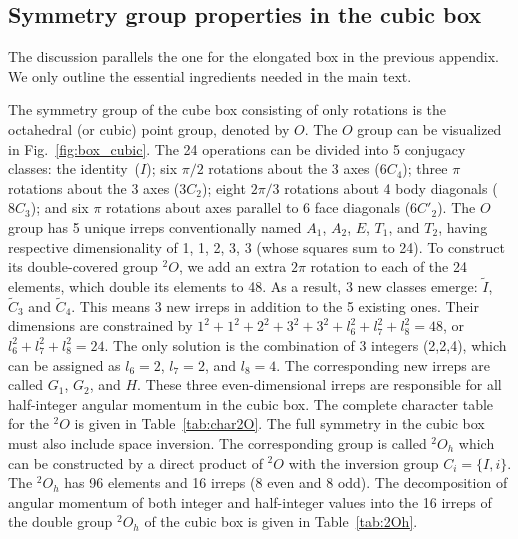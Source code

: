 \documentclass[aps,prd,reprint,showpacs,floatfix,longbibliography,,superscriptaddress]{revtex4-1}
\begin{document}
\begin{widetext}
\section{Symmetry group properties in the cubic box}
\label{app:cubic}

The discussion parallels the one for the elongated box in the previous appendix.
We only outline the essential ingredients needed  in the main text.

The symmetry group of the cube box consisting of only rotations is the octahedral (or cubic) point group, 
denoted by $O$.
The $O$ group can be visualized in Fig.~\ref{fig:box_cubic}. 
The 24 operations can be divided into 5 conjugacy classes: 
the identity~($I$); 
six $\pi/2$ rotations about  the 3 axes ($6C_4$); 
three $\pi$ rotations about the 3 axes ($3C_2$);  
eight $2\pi/3$ rotations about 4 body diagonals ($8C_3$); 
and six $\pi$ rotations about axes parallel to 6 face diagonals ($6C'_2$).
The $O$ group has 5 unique irreps conventionally named $A_1$,  $A_2$,  $E$, $T_1$, and $T_2$, 
having respective dimensionality of 1, 1, 2, 3, 3 (whose squares sum to 24).   
To construct its double-covered group $^2O$, we add an extra $2\pi$ rotation to each of the 24 elements, 
which double its elements to 48.
As a result,  3 new classes emerge:  $\widetilde{I}$, $\widetilde{C}_3$ and $\widetilde{C}_4$.
This means 3 new irreps in addition to the 5 existing ones. Their dimensions are constrained by  
$1^2 + 1^2 + 2^2 + 3^2 +3^2 + l_6^2 + l_7^2 + l_8^2 = 48$, or $ l_6^2 + l_7^2 + l_8^2 = 24$.
The only solution is the combination of 3 integers (2,2,4), which can be assigned as $l_6=2$, $l_7=2$, and $l_8=4$. 
The corresponding new irreps are called $G_1$, $G_2$, and $H$. 
These three  even-dimensional irreps are responsible for all half-integer angular momentum in the cubic box.
The complete character table for the  $^2O$ is given in Table~\ref{tab:char2O}. 
The full symmetry in the cubic box must also include space inversion. The corresponding group is called 
$^2O_h$ which can be constructed by a direct product of $^2O$  with the inversion group $C_i=\{I, i\}$.
The $^2O_h$ has 96 elements and 16 irreps (8 even and 8 odd). 
The decomposition of angular momentum of both integer and half-integer values into the 16 irreps of the double group $^2O_h$ of  the cubic box  is given in Table~\ref{tab:2Oh}. 


\end{widetext}
\end{document}

